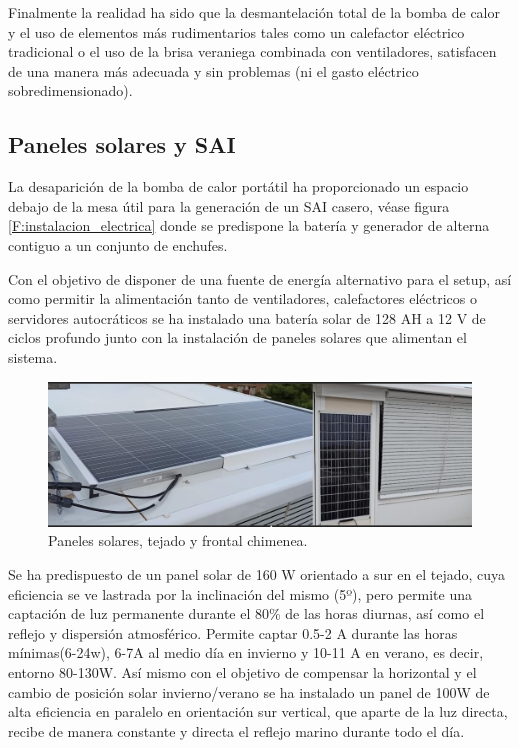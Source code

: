 Finalmente la realidad ha sido que la desmantelación total de la bomba de calor y el uso de elementos más rudimentarios tales como un calefactor eléctrico tradicional o el uso de la brisa veraniega combinada con ventiladores, satisfacen de una manera más adecuada y sin problemas (ni el gasto eléctrico sobredimensionado).

\subsection{Paneles solares y SAI}
La desaparición de la bomba de calor portátil ha proporcionado un espacio debajo de la mesa útil para la generación de un SAI casero, véase figura \ref{F:instalacion_electrica} donde se predispone la batería y generador de alterna contiguo a un conjunto de enchufes. 

Con el objetivo de disponer de una fuente de energía alternativo para el setup, así como permitir la alimentación tanto de ventiladores, calefactores eléctricos o servidores autocráticos se ha instalado una batería solar de 128 AH a 12 V de ciclos profundo junto con la instalación de paneles solares que alimentan el sistema.

\begin{figure}[!htb]
\begin{center}
\includegraphics[width=1\textwidth]{./figuras/panel_solar.jpg}
\caption{Paneles solares, tejado y frontal chimenea.}
\label{F:panel_solar}
\end{center}
\end{figure}

Se ha predispuesto de un panel solar de 160 W orientado a  sur en el tejado, cuya eficiencia se ve lastrada por la inclinación del mismo (5º), pero permite una captación de luz permanente durante el 80\% de las horas diurnas, así como el reflejo y dispersión atmosférico. Permite captar 0.5-2 A durante las horas mínimas(6-24w), 6-7A al medio día en invierno y 10-11 A en verano, es decir, entorno 80-130W. Así mismo con el objetivo de compensar la  horizontal y el cambio de posición solar invierno/verano se ha instalado un panel de 100W de alta eficiencia en paralelo en orientación sur vertical, que aparte de la luz directa, recibe de manera constante y directa el reflejo marino durante todo el día.


